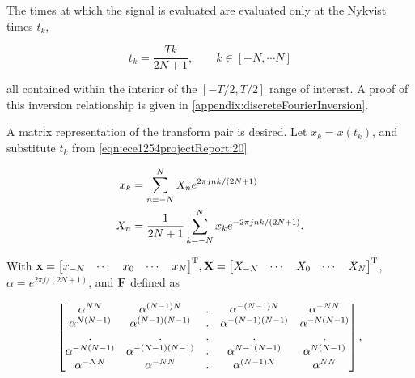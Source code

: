 \documentclass[12pt,journal,compsoc]{../ieeepaper/IEEEtran}
\begin{document}

The times at which the signal is evaluated are evaluated only at the Nykvist times 
\( t_k \), 

\begin{equation}\label{eqn:ece1254projectReport:20}
t_k = \frac{T k}{2 N + 1}, \qquad k \in [-N, \cdots N]
\end{equation}

all contained within the interior of the \( [-T/2, T/2] \) range of interest.  
A proof of this inversion relationship is given in \cref{appendix:discreteFourierInversion}.

A matrix representation of the transform pair is desired.  
Let \( x_k = x(t_k) \), and 
substitute \( t_k \) from \cref{eqn:ece1254projectReport:20}

\begin{equation}\label{eqn:ece1254projectReport:140}
\begin{aligned}
x_k &= \sum_{n = -N}^N X_n e^{ 2 \pi j n k /(2 N + 1)} \\
X_n &= \inv{2 N + 1} \sum_{k = -N}^N x_k e^{- 2 \pi j n k /(2 N + 1)}.
\end{aligned}
\end{equation}

With \( 
\mathbf{x} = 
{\begin{bmatrix}
x_{-N} &
\cdots &
x_0 &
\cdots &
x_{N}
\end{bmatrix}}^{\text{T}},
\mathbf{X} = 
{\begin{bmatrix}
X_{-N} &
\cdots &
X_0 &
\cdots &
X_{N}
\end{bmatrix}}^{\text{T}} 
\),  \( \alpha = e^{ 2 \pi j /(2 N + 1) } \), and \( \mathbf{F} \) defined as

\begin{equation}\label{eqn:discreteFourierMatrixForm:360}
\small
\begin{bmatrix}
 \alpha^{N N } &  \alpha^{\lr{N-1} N }  & . &  \alpha^{- \lr{N-1} N }  &  \alpha^{- N N } \\
 \alpha^{N \lr{N-1} } &  \alpha^{\lr{N-1} \lr{N-1} }  & . &  \alpha^{- \lr{N-1} \lr{N-1} }  &  \alpha^{- N \lr{N-1} } \\
 .              &  .                      & .      & .                           &  .               \\
 \alpha^{- N \lr{N-1} } &  \alpha^{- \lr{N-1} \lr{N-1} }  & . &  \alpha^{{N-1} \lr{N-1} }  &  \alpha^{N \lr{N-1} } \\
 \alpha^{- N N } &  \alpha^{- N N }  & . &  \alpha^{\lr{N-1} N }  &  \alpha^{N N } \\
\end{bmatrix},
\end{equation}
\end{document}
